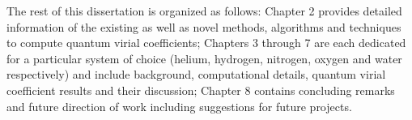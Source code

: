             

        The rest of this dissertation is organized as follows: Chapter 2 provides detailed information of the existing as well as novel methods, algorithms and techniques to compute quantum virial coefficients; Chapters 3 through 7 are each dedicated for a particular system of choice (helium, hydrogen, nitrogen, oxygen and water respectively) and include background, computational details, quantum virial coefficient results and their discussion; Chapter 8 contains concluding remarks and future direction of work including suggestions for future projects.
